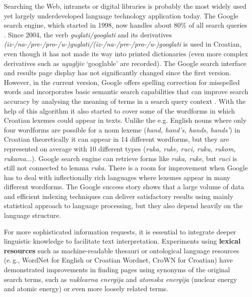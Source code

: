 \begin{multicols}{2}
Searching the Web, intranets or digital libraries is probably the most widely used yet largely underdeveloped language technology application today. The Google search engine, which started in 1998, now handles about 80\% of all search queries \cite{str14}. Since 2004, the verb \emph{guglati/googlati} and its derivatives \emph{(iz-/na-/pre-/pro-/u-)guglati/(iz-/na-/pre-/pro-/u-)googlati} is used in Croatian, even though it has not made its way into printed dictionaries (even more complex derivatives such as \emph{ugugljiv} ‘googlable’ are recorded). The Google search interface and results page display has not significantly changed since the first version. However, in the current version, Google offers spelling correction for misspelled words and incorporates basic semantic search capabilities that can improve search accuracy by analysing the meaning of terms in a search query context \cite{str15}. With the help of this algorithm it also started to cover some of the wordforms in which Croatian lexemes could appear in texts. Unlike the e.g. English nouns where only four wordforms are possible for a noun lexeme (\emph{hand, hand’s, hands, hands’}) in Croatian theoretically it can appear in 14 different wordforms, but they are represented on average with 10 different types (\emph{ruka, ruke, ruci, ruku, rukom, rukama}...). Google search engine can retrieve forms like \emph{ruka, ruke}, but \emph{ruci} is still not connected to lemma \emph{ruka}. There is a room for improvement when Google has to deal with inflectionally rich languages where lexemes appear in many different wordforms. The Google success story shows that a large volume of data and efficient indexing techniques can deliver satisfactory results using mainly statistical approach to language processing, but they also depend heavily on the language structure.


For more sophisticated information requests, it is essential to integrate deeper linguistic knowledge to facilitate text interpretation. Experiments using \textbf{lexical resources} such as machine-readable thesauri or ontological language resources (e.\,g., WordNet for English or Croatian Wordnet, CroWN for Croatian) have demonstrated improvements in finding pages using synonyms of the original search terms, such as \emph{nuklearna energija} and \emph{atomska energija} (nuclear energy and atomic energy) or even more loosely related terms. 


\end{multicols}
